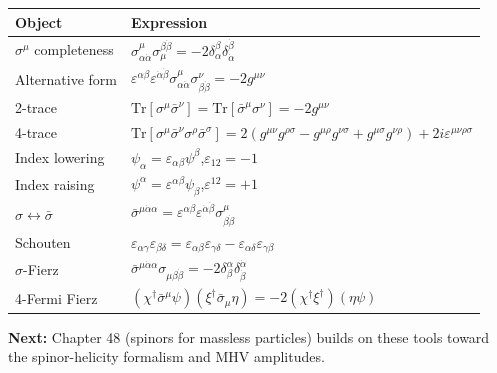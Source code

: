 \documentclass[12pt]{article}
\begin{document}
\begin{center}
\renewcommand{\arraystretch}{1.5}
\begin{tabular}{@{}ll@{}}
  \toprule
  Object & Expression \\
  \midrule
  $\sigma^\mu$ completeness & $\sigma^\mu_{\alpha\dot\alpha}\sigma_\mu^{\beta\dot\beta}=-2\delta_\alpha^\beta\delta_{\dot\alpha}^{\dot\beta}$ \\
  Alternative form & $\varepsilon^{\alpha\beta}\varepsilon^{\dot\alpha\dot\beta}\sigma^\mu_{\alpha\dot\alpha}\sigma^\nu_{\beta\dot\beta}=-2g^{\mu\nu}$ \\
  2-trace & $\mathrm{Tr}[\sigma^\mu\bar\sigma^\nu]=\mathrm{Tr}[\bar\sigma^\mu\sigma^\nu]=-2g^{\mu\nu}$ \\
  4-trace & $\mathrm{Tr}[\sigma^\mu\bar\sigma^\nu\sigma^\rho\bar\sigma^\sigma]=2(g^{\mu\nu}g^{\rho\sigma}-g^{\mu\rho}g^{\nu\sigma}+g^{\mu\sigma}g^{\nu\rho})+2i\varepsilon^{\mu\nu\rho\sigma}$ \\
  Index lowering & $\psi_\alpha=\varepsilon_{\alpha\beta}\psi^\beta$,\quad $\varepsilon_{12}=-1$ \\
  Index raising & $\psi^\alpha=\varepsilon^{\alpha\beta}\psi_\beta$,\quad $\varepsilon^{12}=+1$ \\
  $\sigma\leftrightarrow\bar\sigma$ & $\bar\sigma^{\mu\dot\alpha\alpha}=\varepsilon^{\alpha\beta}\varepsilon^{\dot\alpha\dot\beta}\sigma^\mu_{\beta\dot\beta}$ \\
  Schouten & $\varepsilon_{\alpha\gamma}\varepsilon_{\beta\delta}=\varepsilon_{\alpha\beta}\varepsilon_{\gamma\delta}-\varepsilon_{\alpha\delta}\varepsilon_{\gamma\beta}$ \\
  $\sigma$-Fierz & $\bar\sigma^{\mu\dot\alpha\alpha}\sigma_{\mu\beta\dot\beta}=-2\delta^\alpha_\beta\delta^{\dot\alpha}_{\dot\beta}$ \\
  4-Fermi Fierz & $(\chi^\dagger\bar\sigma^\mu\psi)(\xi^\dagger\bar\sigma_\mu\eta)=-2(\chi^\dagger\xi^\dagger)(\eta\psi)$ \\
  \bottomrule
\end{tabular}
\end{center}

\bigskip
\noindent\textbf{Next:} Chapter 48 (spinors for massless particles) builds
on these tools toward the spinor-helicity formalism and MHV amplitudes.
\end{document}
